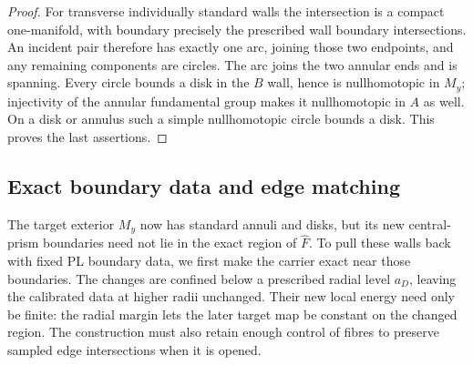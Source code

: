 \documentclass[11pt]{article}
\numberwithin{equation}{section}
\theoremstyle{definition}
\theoremstyle{remark}
\begin{document}
\begin{proof}
For transverse individually standard walls the intersection is a
compact one-manifold, with boundary precisely the prescribed wall
boundary intersections.  An incident pair therefore has exactly one
arc, joining those two endpoints, and any remaining components are
circles.  The arc joins the two annular ends and is spanning.  Every
circle bounds a disk in the $B$ wall, hence is nullhomotopic in $M_y$;
injectivity of the annular fundamental group makes it nullhomotopic
in $A$ as well.  On a disk or annulus such a simple nullhomotopic
circle bounds a disk.  This proves the last assertions.
\end{proof}

\subsection{Exact boundary data and edge matching}

The target exterior $M_y$ now has standard annuli and disks, but its
new central-prism boundaries need not lie in the exact region of
$\widehat F$.  To pull these walls back with fixed PL boundary data,
we first make the carrier exact near those boundaries.  The changes
are confined below a prescribed radial level $a_D$, leaving the
calibrated data at higher radii unchanged.  Their new local energy
need only be finite: the radial margin lets the later target map be
constant on the changed region.  The construction must also retain enough control of
fibres to preserve sampled edge intersections when it is opened.
\end{document}
